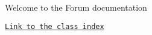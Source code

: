 Welcome to the Forum documentation \begin{DoxyParagraph}{}

\end{DoxyParagraph}
\href{classes.html}{\tt Link to the class index} 